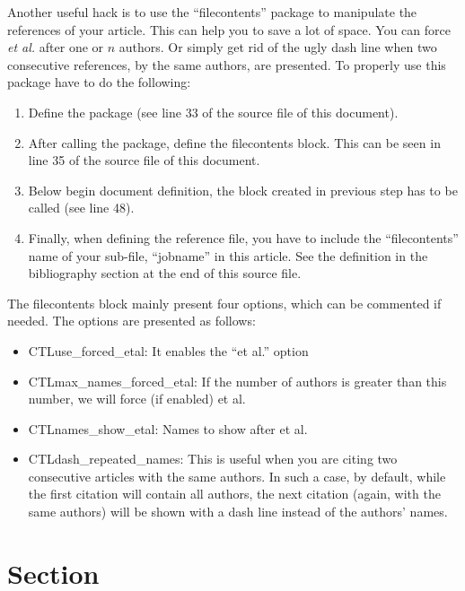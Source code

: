 \documentclass[conference]{IEEEtran}
\begin{document}
Another useful hack is to use the ``filecontents'' package to manipulate the references of your article. 
This can help you to save a lot of space.
You can force \textit{et al.} after one or $n$ authors. Or simply get rid of the ugly dash line when two consecutive references, by the same authors, are presented. 
To properly use this package have to do the following:
\begin{enumerate}
    \item Define the package (see line 33 of the source file of this document).
    \item After calling the package, define the filecontents block. 
    This can be seen in line 35 of the source file of this document.
    \item Below begin document definition, the block created in previous step has to be called (see line 48).
    \item Finally, when defining the reference file, you have to include the ``filecontents'' name of your sub-file, ``jobname'' in this article.
    See the definition in the bibliography section at the end of this source file. 
\end{enumerate}

The filecontents block mainly present four options, which can be commented if needed.
The options are presented as follows:
\begin{itemize}
    \item CTLuse\_forced\_etal: It enables the ``et al.'' option 
    \item CTLmax\_names\_forced\_etal: If the number of authors is greater than this number, we will force (if enabled) et al.
    \item CTLnames\_show\_etal: Names to show after et al.
    \item CTLdash\_repeated\_names: This is useful when you are citing two consecutive articles with the same authors.
    In such a case, by default, while the first citation will contain all authors, the next citation (again, with the same authors) will be shown with a dash line instead of the authors' names.
\end{itemize}




\IEEEpubidadjcol



\section{Section}\label{sec:two}
\end{document}
